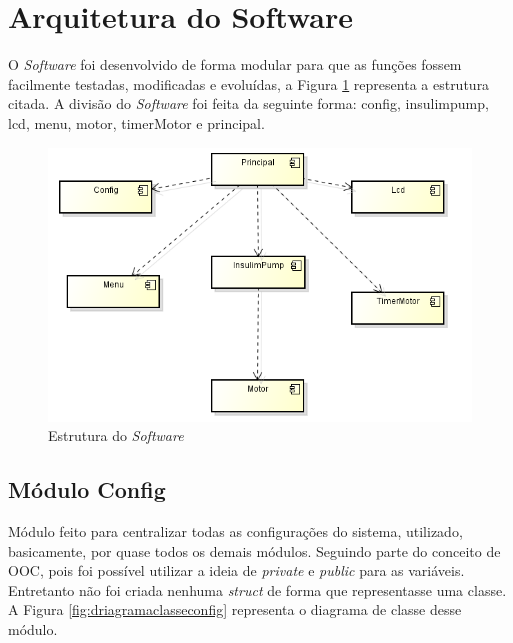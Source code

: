 \section{Arquitetura do Software}

O \emph{Software} foi desenvolvido de forma modular para que as funções fossem facilmente testadas, modificadas e evoluídas, a Figura \ref{fig:arquiteturageral} representa a estrutura citada. A divisão do \emph{Software} foi feita da seguinte forma: config, insulimpump, lcd, menu, motor, timerMotor e principal. 

\begin{figure}[htp]
	\centering
	\includegraphics[scale=0.7]{images/arquitetura.png}
	\caption{Estrutura do \emph{Software}}	
	\label{fig:arquiteturageral}
\end{figure}

\subsection{Módulo Config}

Módulo feito para centralizar todas as configurações do sistema, utilizado, basicamente, por quase todos os demais módulos. Seguindo parte do conceito de OOC, pois foi possível utilizar a ideia de \emph{private} e \emph{public} para as variáveis. Entretanto não foi criada nenhuma \emph{struct} de forma que representasse uma classe. A Figura \ref{fig:driagramaclasseconfig} representa o diagrama de classe desse módulo. \newpage



